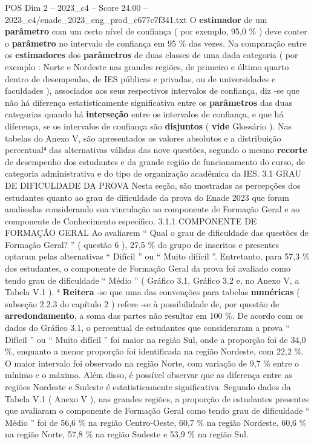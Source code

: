 \begin{textsample}{POS Dim 2 – 2023\_c4 – Score 24.00 – 2023\_c4/enade\_2023\_eng\_prod\_c677c7f341.txt}
O \textbf{estimador} de um \textbf{parâmetro} com um certo nível de confiança ( por exemplo, 95,0 \% ) deve conter o \textbf{parâmetro} no intervalo de confiança em 95 \% das vezes.
Na comparação entre os \textbf{estimadores} dos \textbf{parâmetros} de duas classes de uma dada categoria ( por exemplo : Norte e Nordeste nas grandes regiões, de primeiro e último quarto dentro de desempenho, de IES públicas e privadas, ou de universidades e faculdades ), associados aos seus respectivos intervalos de confiança, diz -se que não há diferença estatisticamente significativa entre os \textbf{parâmetros} das duas categorias quando há \textbf{interseção} entre os intervalos de confiança, e que há diferença, se os intervalos de confiança são \textbf{disjuntos} ( \textbf{vide} Glossário ).
Nas tabelas do Anexo V, são apresentados os valores absolutos e a distribuição percentual⁴ das alternativas válidas das nove questões, segundo o mesmo \textbf{recorte} de desempenho dos estudantes e da grande região de funcionamento do curso, de categoria administrativa e do tipo de organização acadêmica da IES. 3.1 GRAU DE DIFICULDADE DA PROVA Nesta seção, são mostradas as percepções dos estudantes quanto ao grau de dificuldade da prova do Enade 2023 que foram analisadas considerando sua vinculação ao componente de Formação Geral e ao componente de Conhecimento específico. 3.1.1 COMPONENTE DE FORMAÇÃO GERAL Ao avaliarem “ Qual o grau de dificuldade das questões de Formação Geral? ” ( questão 6 ), 27,5 \% do grupo de inscritos e presentes optaram pelas alternativas “ Difícil ” ou “ Muito difícil ”.
Entretanto, para 57,3 \% dos estudantes, o componente de Formação Geral da prova foi avaliado como tendo grau de dificuldade “ Médio ” ( Gráfico 3.1, Gráfico 3.2 e, no Anexo V, a Tabela V.1 ). ⁴ \textbf{Reitera} -se que uma das convenções para tabelas \textbf{numéricas} ( subseção 2.2.3 do capítulo 2 ) refere -se à possibilidade de, por questão de \textbf{arredondamento}, a soma das partes não resultar em 100 \%.
De acordo com os dados do Gráfico 3.1, o percentual de estudantes que consideraram a prova “ Difícil ” ou “ Muito difícil ” foi maior na região Sul, onde a proporção foi de 34,0 \%, enquanto a menor proporção foi identificada na região Nordeste, com 22,2 \%.
O maior intervalo foi observado na região Norte, com variação de 9,7 \% entre o mínimo e o máximo.
Além disso, é possível observar que as diferença entre as regiões Nordeste e Sudeste é estatisticamente significativa.
Segundo dados da Tabela V.1 ( Anexo V ), nas grandes regiões, a proporção de estudantes presentes que avaliaram o componente de Formação Geral como tendo grau de dificuldade “ Médio ” foi de 56,6 \% na região Centro-Oeste, 60,7 \% na região Nordeste, 60,6 \% na região Norte, 57,8 \% na região Sudeste e 53,9 \% na região Sul.

\end{textsample}
